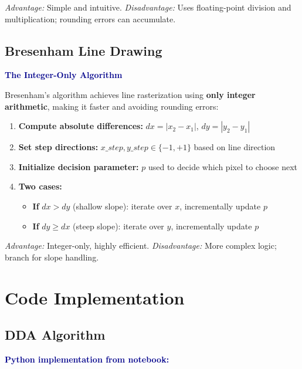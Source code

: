 \documentclass[12pt,a4paper]{article}
\begin{document}
\textcolor{coralred}{\textit{Advantage:}} Simple and intuitive. \quad \textcolor{coralred}{\textit{Disadvantage:}} Uses floating-point division and multiplication; rounding errors can accumulate.

\subsection{Bresenham Line Drawing}
\textcolor{darkblue}{\textbf{The Integer-Only Algorithm}}

Bresenham's algorithm achieves line rasterization using \textbf{only integer arithmetic}, making it faster and avoiding rounding errors:

\begin{enumerate}
  \item \textbf{Compute absolute differences:} $dx = |x_2 - x_1|$, $dy = |y_2 - y_1|$
  \item \textbf{Set step directions:} $x\_step, y\_step \in \{-1, +1\}$ based on line direction
  \item \textbf{Initialize decision parameter:} $p$ used to decide which pixel to choose next
  \item \textbf{Two cases:}
    \begin{itemize}
      \item \textbf{If } $dx > dy$ (shallow slope): iterate over $x$, incrementally update $p$
      \item \textbf{If } $dy \geq dx$ (steep slope): iterate over $y$, incrementally update $p$
    \end{itemize}
\end{enumerate}

\textcolor{coralred}{\textit{Advantage:}} Integer-only, highly efficient. \quad \textcolor{coralred}{\textit{Disadvantage:}} More complex logic; branch for slope handling.


\section{Code Implementation}

\subsection{DDA Algorithm}
\textcolor{darkblue}{\textbf{Python implementation from notebook:}}
\end{document}
